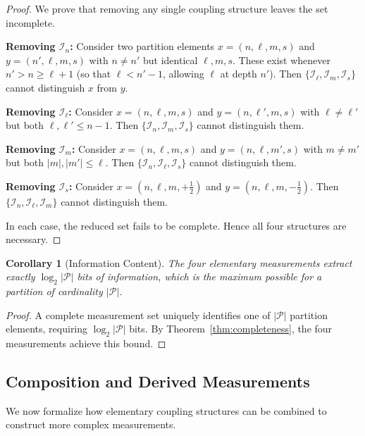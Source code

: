 \documentclass[twocolumn,10pt,a4paper]{article}
\newtheorem{corollary}[theorem]{Corollary}
\theoremstyle{remark}
\newcommand{\partition}{\mathcal{P}}
\begin{document}
\begin{proof}
We prove that removing any single coupling structure leaves the set incomplete.

\textbf{Removing $\mathcal{I}_n$:} Consider two partition elements $x = (n, \ell, m, s)$ and $y = (n', \ell, m, s)$ with $n \neq n'$ but identical $\ell, m, s$. These exist whenever $n' > n \geq \ell + 1$ (so that $\ell < n' - 1$, allowing $\ell$ at depth $n'$). Then $\{\mathcal{I}_\ell, \mathcal{I}_m, \mathcal{I}_s\}$ cannot distinguish $x$ from $y$.

\textbf{Removing $\mathcal{I}_\ell$:} Consider $x = (n, \ell, m, s)$ and $y = (n, \ell', m, s)$ with $\ell \neq \ell'$ but both $\ell, \ell' \leq n-1$. Then $\{\mathcal{I}_n, \mathcal{I}_m, \mathcal{I}_s\}$ cannot distinguish them.

\textbf{Removing $\mathcal{I}_m$:} Consider $x = (n, \ell, m, s)$ and $y = (n, \ell, m', s)$ with $m \neq m'$ but both $|m|, |m'| \leq \ell$. Then $\{\mathcal{I}_n, \mathcal{I}_\ell, \mathcal{I}_s\}$ cannot distinguish them.

\textbf{Removing $\mathcal{I}_s$:} Consider $x = (n, \ell, m, +\tfrac{1}{2})$ and $y = (n, \ell, m, -\tfrac{1}{2})$. Then $\{\mathcal{I}_n, \mathcal{I}_\ell, \mathcal{I}_m\}$ cannot distinguish them.

In each case, the reduced set fails to be complete. Hence all four structures are necessary.
\end{proof}

\begin{corollary}[Information Content]
\label{cor:information_content}
The four elementary measurements extract exactly $\log_2 |\partition|$ bits of information, which is the maximum possible for a partition of cardinality $|\partition|$.
\end{corollary}

\begin{proof}
A complete measurement set uniquely identifies one of $|\partition|$ partition elements, requiring $\log_2 |\partition|$ bits. By Theorem~\ref{thm:completeness}, the four measurements achieve this bound.
\end{proof}

\subsection{Composition and Derived Measurements}

We now formalize how elementary coupling structures can be combined to construct more complex measurements.
\end{document}
